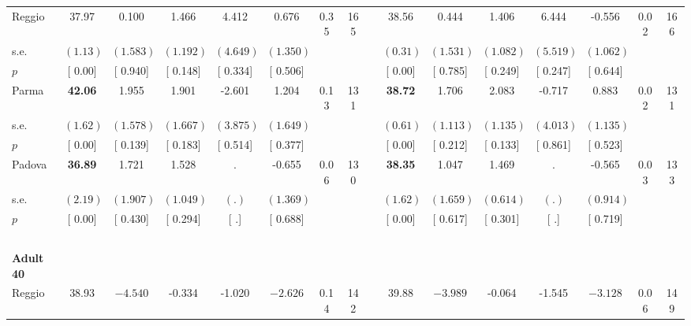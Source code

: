 \begin{longtable}{L{8em} c c c c c c c p{1em} c c c c c c c}
\quad \quad \quad Reggio& 37.97 &     0.100 &     1.466 &     4.412 &     0.676 &      0.35 &       165 & & 38.56 &     0.444 &     1.406 &     6.444 &    -0.556 &      0.02 &       166  \\*
\quad \quad \quad \quad s.e.& $ (     1.13)$ & $ (    1.583)$ & $ (    1.192)$ & $ (    4.649)$ & $ (    1.350)$ & & & & $ (     0.31)$ & $ (    1.531)$ & $ (    1.082)$ & $ (    5.519)$ & $ (    1.062)$ & &  \\*
\quad \quad \quad \quad $ p$ & [     0.00] & [    0.940] & [    0.148] & [    0.334] & [    0.506] & & & & [     0.00] & [    0.785] & [    0.249] & [    0.247] & [    0.644] & &  \\[1em]
\quad \quad \quad Parma& \textbf{    42.06} &     1.955 &     1.901 &    -2.601 &     1.204 &      0.13 &       131 & & \textbf{    38.72} &     1.706 &     2.083 &    -0.717 &     0.883 &      0.02 &       131  \\*
\quad \quad \quad \quad s.e.& $ (     1.62)$ & $ (    1.578)$ & $ (    1.667)$ & $ (    3.875)$ & $ (    1.649)$ & & & & $ (     0.61)$ & $ (    1.113)$ & $ (    1.135)$ & $ (    4.013)$ & $ (    1.135)$ & &  \\*
\quad \quad \quad \quad $ p$ & [     0.00] & [    0.139] & [    0.183] & [    0.514] & [    0.377] & & & & [     0.00] & [    0.212] & [    0.133] & [    0.861] & [    0.523] & &  \\[1em]
\quad \quad \quad Padova& \textbf{    36.89} &     1.721 &     1.528 &         . &    -0.655 &      0.06 &       130 & & \textbf{    38.35} &     1.047 &     1.469 &         . &    -0.565 &      0.03 &       133  \\*
\quad \quad \quad \quad s.e.& $ (     2.19)$ & $ (    1.907)$ & $ (    1.049)$ & $ (        .)$ & $ (    1.369)$ & & & & $ (     1.62)$ & $ (    1.659)$ & $ (    0.614)$ & $ (        .)$ & $ (    0.914)$ & &  \\*
\quad \quad \quad \quad $ p$ & [     0.00] & [    0.430] & [    0.294] & [        .] & [    0.688] & & & & [     0.00] & [    0.617] & [    0.301] & [        .] & [    0.719] & &  \\[1em]
~\\[1em]
\quad \quad \textbf{Adult 40} & & & & & & & & & & & & & & & \\* 
\quad \quad \quad Reggio& 38.93 & $ \mathbf{   -4.540}$ &    -0.334 &    -1.020 & $ \mathbf{   -2.626}$ &      0.14 &       142 & & 39.88 & $ \mathbf{   -3.989}$ &    -0.064 &    -1.545 & $ \mathbf{   -3.128}$ &      0.06 &       149  \\*

\end{longtable}
